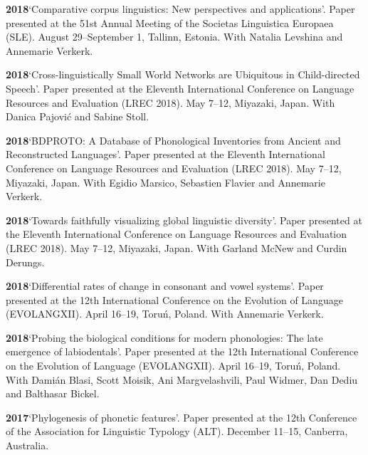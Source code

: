 \documentclass[11pt]{article}
\newcommand{\hangpara}{
 \setlength{\parindent}{0in} %
 \hangindent=0.42in %
}
\begin{document}
\vskip 6pt
\hangpara
{\bf 2018}\hspace{1ex}`Comparative corpus linguistics: New perspectives and applications'. Paper presented at the 51st Annual Meeting of the Societas Linguistica Europaea (SLE). August 29--September 1, Tallinn, Estonia. With Natalia Levshina and Annemarie Verkerk.

\vskip 6pt
\hangpara
{\bf 2018}\hspace{1ex}`Cross-linguistically Small World Networks are Ubiquitous in Child-directed Speech'. Paper presented at the Eleventh International Conference on Language Resources and Evaluation (LREC 2018). May 7--12, Miyazaki, Japan. With Danica Pajovi{\'c} and Sabine Stoll.

\vskip 6pt
\hangpara
{\bf 2018}\hspace{1ex}`BDPROTO: A Database of Phonological Inventories from Ancient and Reconstructed Languages'. Paper presented at the Eleventh International Conference on Language Resources and Evaluation (LREC 2018). May 7--12, Miyazaki, Japan. With Egidio Marsico, Sebastien Flavier and Annemarie Verkerk.

\vskip 6pt
\hangpara
{\bf 2018}\hspace{1ex}`Towards faithfully visualizing global linguistic diversity'. Paper presented at the Eleventh International Conference on Language Resources and Evaluation (LREC 2018). May 7--12, Miyazaki, Japan. With Garland McNew and Curdin Derungs.

\vskip 6pt
\hangpara
{\bf 2018}\hspace{1ex}`Differential rates of change in consonant and vowel systems'. Paper presented at the 12th International Conference on the Evolution of Language (EVOLANGXII). April 16--19, Toru{\'n}, Poland. With Annemarie Verkerk. %

\vskip 6pt
\hangpara
{\bf 2018}\hspace{1ex}`Probing the biological conditions for modern phonologies: The late emergence of labiodentals'. Paper presented at the 12th International Conference on the Evolution of Language (EVOLANGXII). April 16--19, Toru{\'n}, Poland. With Dami{\'a}n Blasi, Scott Moisik, Ani Margvelashvili, Paul Widmer, Dan Dediu and Balthasar Bickel.

\vskip 6pt
\hangpara
{\bf 2017}\hspace{1ex}`Phylogenesis of phonetic features'. Paper presented at the 12th Conference of the Association for Linguistic Typology (ALT). December 11--15, Canberra, Australia.
\end{document}
